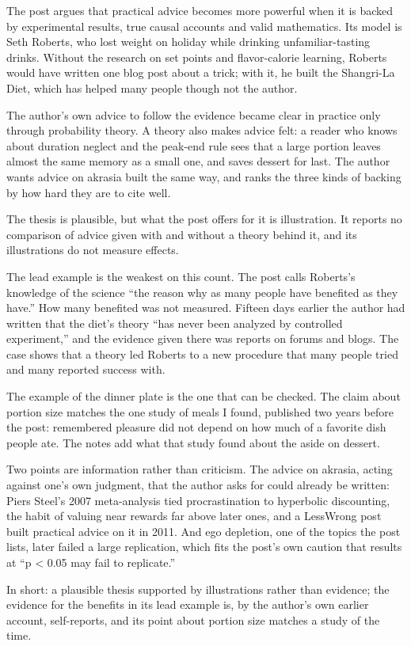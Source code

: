 \begin{afterword}
\summaryhead

The post argues that practical advice becomes more powerful when it is backed by experimental results, true causal accounts and valid mathematics. Its model is Seth Roberts, who lost weight on holiday while drinking unfamiliar-tasting drinks. Without the research on set points and flavor-calorie learning, Roberts would have written one blog post about a trick; with it, he built the Shangri-La Diet, which has helped many people though not the author.

The author's own advice to follow the evidence became clear in practice only through probability theory. A theory also makes advice felt: a reader who knows about duration neglect and the peak-end rule sees that a large portion leaves almost the same memory as a small one, and saves dessert for last. The author wants advice on akrasia built the same way, and ranks the three kinds of backing by how hard they are to cite well.

\responsehead

The thesis is plausible, but what the post offers for it is illustration. It reports no comparison of advice given with and without a theory behind it, and its illustrations do not measure effects.

The lead example is the weakest on this count. The post calls Roberts's knowledge of the science ``the reason why as many people have benefited as they have.'' How many benefited was not measured. Fifteen days earlier the author had written that the diet's theory ``has never been analyzed by controlled experiment,'' and the evidence given there was reports on forums and blogs. The case shows that a theory led Roberts to a new procedure that many people tried and many reported success with.

The example of the dinner plate is the one that can be checked. The claim about portion size matches the one study of meals I found, published two years before the post: remembered pleasure did not depend on how much of a favorite dish people ate. The notes add what that study found about the aside on dessert.

Two points are information rather than criticism. The advice on akrasia, acting against one's own judgment, that the author asks for could already be written: Piers Steel's 2007 meta-analysis tied procrastination to hyperbolic discounting, the habit of valuing near rewards far above later ones, and a LessWrong post built practical advice on it in 2011. And ego depletion, one of the topics the post lists, later failed a large replication, which fits the post's own caution that results at ``p < 0.05 may fail to replicate.''

In short: a plausible thesis supported by illustrations rather than evidence; the evidence for the benefits in its lead example is, by the author's own earlier account, self-reports, and its point about portion size matches a study of the time.
\end{afterword}
